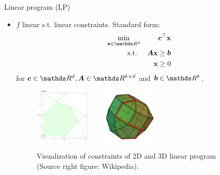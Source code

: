 \documentclass[11pt,compress,t,notes=noshow, xcolor=table]{beamer}
\begin{document}
\begin{vbframe}{Linear program (LP)}

\vspace*{-0.3cm}

\begin{itemize}
	\item $f$ linear s.t. linear constraints. Standard form: 
	\vspace*{-0.2cm}
	\begin{eqnarray*}
	\min_{\xv \in \R^d} && \bm{c}^\top\xv\\
	\text{s.t. } && \bm{A}\xv \ge \bm{b} \\
	&& \xv \ge 0
	\end{eqnarray*}
	for $\bm{c}\in \R^d, \bm{A} \in \R^{k \times d}$ and $\bm{b} \in \R^k$. 

	\begin{figure}
		\includegraphics[width=0.25\textwidth]{figure_man/simplex_iter1.png} ~~~ \includegraphics[width=0.25\textwidth]{figure_man/simplex.png} \\
		\begin{footnotesize}
		Visualization of constraints of 2D and 3D linear program (Source right figure: Wikipedia). 
		\end{footnotesize}
	\end{figure}
\end{itemize}
\end{vbframe}
\end{document}
